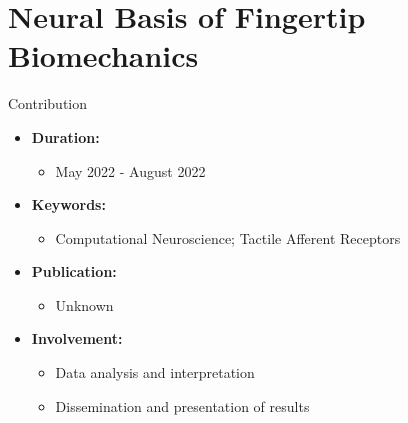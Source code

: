 \documentclass[
11pt,notheorems,hyperref={pdfauthor=whatever}
]{beamer}
\begin{document}
\section{Neural Basis of Fingertip Biomechanics}
\begin{frame}{}{Contribution}
\begin{itemize}
    \item \textbf{Duration:} 
    \begin{itemize}
        \item May 2022 - August 2022
    \end{itemize}
    \item \textbf{Keywords:} 
    \begin{itemize}
        \item Computational Neuroscience; Tactile Afferent Receptors
    \end{itemize}
    \item \textbf{Publication:} 
    \begin{itemize}
        \item Unknown
    \end{itemize}
    \item \textbf{Involvement:}
    \begin{itemize}
        \item Data analysis and interpretation
        \item Dissemination and presentation of results
    \end{itemize}
\end{itemize}
\end{frame}
\end{document}
